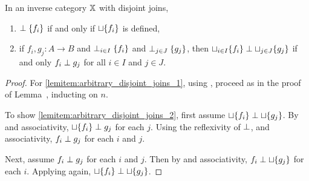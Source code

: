 \begin{lemma}\label{lem:arbitrary_disjoint_joins}
  In an inverse category $\mathbb{X}$ with disjoint joins,
  \begin{enumerate}[{(}i{)}]
    \item $\perp \{f_i\}$ if and only if  $\sqcup \{f_i\}$ is
      defined,\label{lemitem:arbitrary_disjoint_joins_1}
    \item if $f_i, g_j : A \to B$ and $\perp_{i\in I} \{f_i\}$ and $\perp_{j\in J} \{g_j\}$,
      then $\sqcup_{i\in I} \{f_i\} \perp \sqcup_{j\in J} \{g_j\}$ if and only $f_i \perp g_j$
      for all $i\in I$ and $j\in J$. \label{lemitem:arbitrary_disjoint_joins_2}
  \end{enumerate}
\end{lemma}
\begin{proof}
  For \ref{lemitem:arbitrary_disjoint_joins_1}, using , proceed as in the proof of
  Lemma~,
  inducting on $n$.

  To show \ref{lemitem:arbitrary_disjoint_joins_2}, first assume $\sqcup \{f_i\} \perp \sqcup
  \{g_j\}$. By  and associativity, $\sqcup \{f_i\} \perp g_j$ for each
  $j$. Using the reflexivity of $\perp$,  and associativity, $f_i \perp
  g_j$ for each $i$ and $j$.

  Next, assume $f_i \perp g_j$ for each $i$ and $j$. Then by  and associativity, $f_i
  \perp \sqcup \{g_j\}$ for each $i$. Applying  again, $\sqcup \{f_i\} \perp
  \sqcup \{g_j\}$.
\end{proof}

